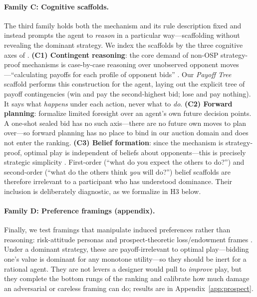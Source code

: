 \paragraph{Family C: Cognitive scaffolds.}
The third family holds both the mechanism and its rule description fixed and
instead prompts the agent to \emph{reason} in a particular way---scaffolding
without revealing the dominant strategy. We index the scaffolds by the three
cognitive axes of \citet{li2024designing}. \textbf{(C1) Contingent reasoning}:
the core demand of non-OSP strategy-proof mechanisms is case-by-case reasoning
over unobserved opponent moves---``calculating payoffs for each profile of
opponent bids'' \citep{li2024designing}. Our \emph{Payoff Tree} scaffold
performs this construction for the agent, laying out the explicit tree of
payoff contingencies (win and pay the second-highest bid; lose and pay
nothing). It says what \emph{happens} under each action, never
what to \emph{do}. \textbf{(C2) Forward planning}: \citet{pycia2023theory}
formalize limited foresight over an agent's own future decision points. A
one-shot sealed bid has no such axis---there are no future own moves to plan
over---so forward planning has no place to bind in our auction domain and does
not enter the ranking. \textbf{(C3) Belief formation}: since the mechanism is
strategy-proof, optimal play is independent of beliefs about opponents---this
is precisely strategic simplicity \citep{borgers2019strategically}. First-order (``what do
you expect the others to do?'') and second-order (``what do the others think
\emph{you} will do?'') belief scaffolds are therefore irrelevant to a
participant who has understood dominance. Their inclusion is deliberately
diagnostic, as we formalize in H3 below.

\paragraph{Family D: Preference framings (appendix).}
Finally, we test framings that manipulate induced preferences rather than
reasoning: risk-attitude personas and prospect-theoretic loss/endowment frames
\citep{kahneman1979prospect, dreyfuss2022expectations}. Under a dominant
strategy, these are payoff-irrelevant to optimal play---bidding one's value is
dominant for any monotone utility---so they should be inert for a rational
agent. They are not levers a designer would pull to \emph{improve} play, but
they complete the bottom rungs of the ranking and calibrate how much damage an
adversarial or careless framing can do; results are in
Appendix~\ref{app:prospect}.

